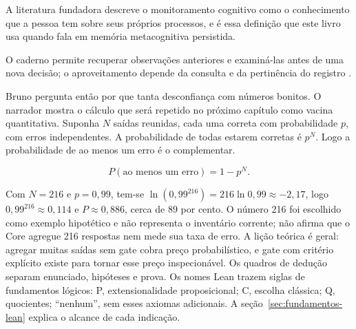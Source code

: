 A literatura fundadora descreve o monitoramento cognitivo como o conhecimento que a pessoa tem sobre seus pr\'oprios processos, e \'e essa defini\c{c}\~ao que este livro usa quando fala em mem\'oria metacognitiva persistida.

O caderno permite recuperar observa\c{c}\~oes anteriores e examin\'a-las antes de uma nova decis\~ao; o aproveitamento depende da consulta e da pertin\^encia do registro .

Bruno pergunta ent\~ao por que tanta desconfian\c{c}a com n\'umeros bonitos. O narrador mostra o c\'alculo que ser\'a repetido no pr\'oximo cap\'itulo como vacina quantitativa. Suponha $N$ sa\'idas reunidas, cada uma correta com probabilidade $p$, com erros independentes. A probabilidade de todas estarem corretas \'e $p^{N}$. Logo a probabilidade de ao menos um erro \'e o complementar.

\[ P(\mbox{ao menos um erro}) = 1 - p^{N}. \]

Com $N=216$ e $p=0{,}99$, tem-se $\ln(0{,}99^{216}) = 216 \ln 0{,}99 \approx -2{,}17$, logo $0{,}99^{216} \approx 0{,}114$ e $P \approx 0{,}886$, cerca de 89 por cento. O n\'umero 216 foi escolhido como exemplo hipot\'etico e n\~ao representa o invent\'ario corrente; n\~ao afirma que o Core agregue 216 respostas nem mede sua taxa de erro. A li\c{c}\~ao te\'orica \'e geral: agregar muitas sa\'idas sem gate cobra pre\c{c}o probabil\'istico, e gate com crit\'erio expl\'icito existe para tornar esse pre\c{c}o inspecion\'avel.
\noindent Os quadros de dedução separam enunciado, hipóteses e prova. Os nomes Lean
trazem siglas de fundamentos lógicos: P, extensionalidade proposicional;
C, escolha clássica; Q, quocientes; ``nenhum'', sem esses axiomas adicionais.
A seção~\ref{sec:fundamentos-lean} explica o alcance de cada indicação.

